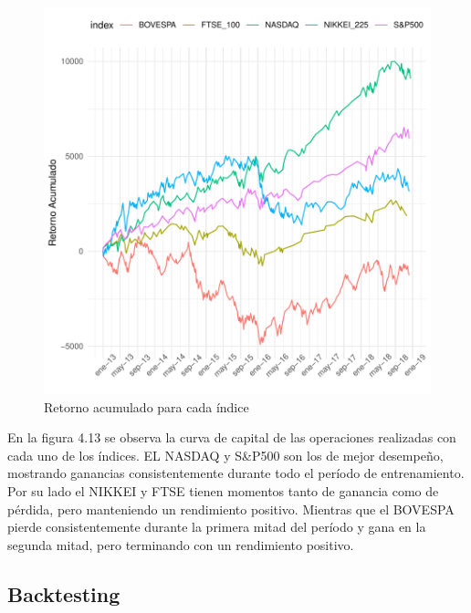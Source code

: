\documentclass[a4paper,12pt]{Latex/Classes/PhDthesisPSnPDF}
\begin{document}
\begin{figure}[H]
\centering
\includegraphics{main-033}
\caption{Retorno acumulado para cada índice}
\end{figure}

En la figura 4.13 se observa la curva de capital de las operaciones realizadas con cada uno de los índices. EL NASDAQ y S\&P500 son los de mejor desempeño, mostrando ganancias consistentemente durante todo el período de entrenamiento. Por su lado el NIKKEI y FTSE tienen momentos tanto de ganancia como de pérdida, pero manteniendo un rendimiento positivo. Mientras que el BOVESPA pierde consistentemente durante la primera mitad del período y gana en la segunda mitad, pero terminando con un rendimiento positivo.

\subsection{Backtesting}
\end{document}
